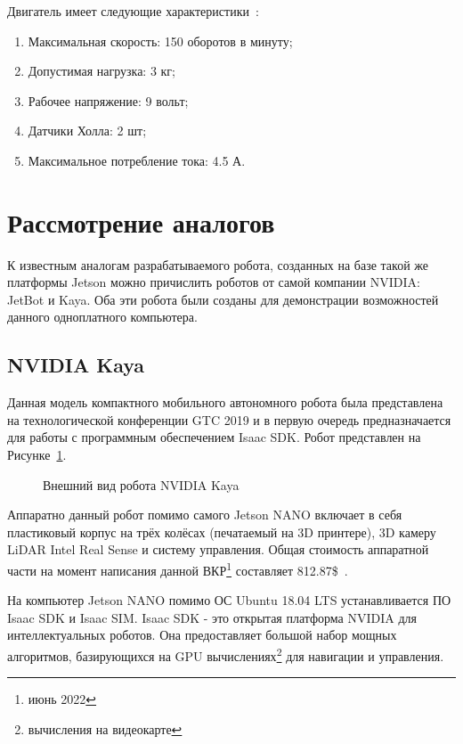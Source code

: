 Двигатель имеет следующие характеристики~\cite{motor}:
\begin{enumerate}[beginpenalty=10000] %
  \item Максимальная скорость: 150 оборотов в минуту;
  \item Допустимая нагрузка: 3 кг;
  \item Рабочее напряжение: 9 вольт;
  \item Датчики Холла: 2 шт;
  \item Максимальное потребление тока: 4.5 А.
\end{enumerate}

\section{Рассмотрение аналогов}
К известным аналогам разрабатываемого робота, созданных на базе такой же платформы Jetson можно причислить роботов от самой компании NVIDIA: JetBot и Kaya. Оба эти робота были созданы для демонстрации возможностей данного одноплатного компьютера.

\subsection{NVIDIA Kaya}
Данная модель компактного мобильного автономного робота была представлена на технологической конференции GTC 2019 и в первую очередь предназначается для работы с программным обеспечением Isaac SDK. Робот представлен на Рисунке~\cref{fig:kaya}.

\begin{figure}[ht]
    \caption{Внешний вид робота NVIDIA Kaya}\label{fig:kaya}
\end{figure}

Аппаратно данный робот помимо самого Jetson NANO включает в себя пластиковый корпус на трёх колёсах (печатаемый на 3D принтере), 3D камеру LiDAR Intel Real Sense и систему управления. Общая стоимость аппаратной части на момент написания данной ВКР\footnote{июнь 2022} составляет 812.87\$~\cite{kaya}.

На компьютер Jetson NANO помимо ОС Ubuntu 18.04 LTS устанавливается ПО Isaac SDK и Isaac SIM. Isaac SDK - это открытая платформа NVIDIA для интеллектуальных роботов. Она предоставляет большой набор мощных алгоритмов, базирующихся на GPU вычислениях\footnote{вычисления на видеокарте} для навигации и управления.

